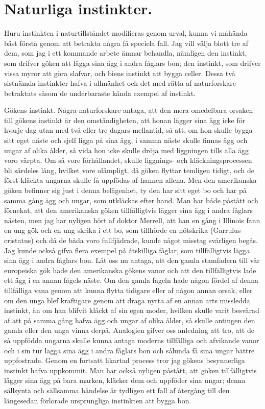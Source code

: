 \section{Naturliga instinkter.}

Huru instinkten i naturtillståndet modifieras genom urval, kunna vi måhända bäst förstå genom att betrakta några få speciela fall. Jag vill välja blott tre af dem, som jag i ett kommande arbete ämnar behandla, nämligen den instinkt, som drifver göken att lägga sina ägg i andra fåglars bon; den instinkt, som drifver vissa myror att göra slafvar, och biens instinkt att bygga celler. Dessa två sistnämda instinkter hafva i allmänhet och det med rätta af naturforskare betraktats såsom de underbaraste kända exempel af instinkt.

Gökens instinkt. Några naturforskare antaga, att den mera omedelbara orsaken till gökens instinkt är den omständigheten, att honan lägger sina ägg icke för hvarje dag utan med två eller tre dagars mellantid, så att, om hon skulle bygga sitt eget näste och sjelf ligga på sina ägg, i samma näste skulle finnas ägg och ungar af olika ålder, så vida hon icke skulle dröja med liggningen tills alla ägg voro värpta. Om så vore förhållandet, skulle liggnings- och kläckningsprocessen bli särdeles lång, hvilket vore olämpligt, då göken flyttar temligen tidigt, och de först kläckta ungarna skulle få uppfödas af hannen allena. Men den amerikanska göken befinner sig just i denna belägenhet, ty den har sitt eget bo och har på samma gång ägg och ungar, som utkläckas efter hand. Man har både påstått och förnekat, att den amerikanska göken tillfälligtvis lägger sina ägg i andra fåglars nästen, men jag har nyligen hört af doktor Merrell, att han en gång i Illinois fann en ung gök och en ung skrika i ett bo, som tillhörde en nötskrika (Garrulus cristatus) och då de båda voro fullfjädrade, kunde något misstag svårligen begås. Jag kunde också gifva flera exempel på åtskilliga fåglar, som tillfälligtvis lägga sina ägg i andra fåglars bon. Låt oss nu antaga, att den gamla stamfadern till vår europeiska gök hade den amerikanska gökens vanor och att den tillfälligtvis lade ett ägg i en annan fågels näste. Om den gamla fågeln hade någon fördel af denna tillfälliga vana genom att kunna flytta tidigare eller af någon annan orsak, eller om den unga blef kraftigare genom att draga nytta af en annan arts missledda instinkt, än om han blifvit kläckt af sin egen moder, hvilken skulle varit besvärad af att på samma gång hafva ägg och ungar af olika ålder, så skulle antingen den gamla eller den unga vinna derpå. Analogien gifver oss anledning att tro, att de så uppfödda ungarna skulle kunna antaga moderns tillfälliga och afvikande vanor och i sin tur lägga sina ägg i andra fåglars bon och sålunda få sina ungar bättre uppfostrade. Genom en fortsatt likartad process tror jag gökens besynnerliga instinkt hafva uppkommit. Man har också nyligen påstått, att göken tillfälligtvis lägger sina ägg på bara marken, kläcker dem och uppföder sina ungar; denna sällsynta och sällsamma händelse är tydligen ett fall af återgång till den längesedan förlorade ursprungliga instinkten att bygga bon.


